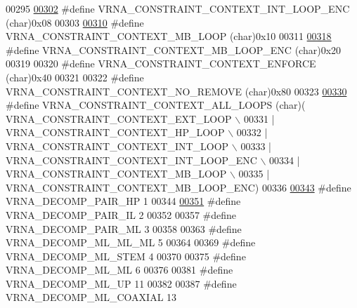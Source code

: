 \begin{DoxyCode}
00295 
\hypertarget{constraints_8h_source_l00302}{}\hyperlink{group__hard__constraints_ga0536288e04ff6332ecdc23ca4705402b}{00302} \textcolor{preprocessor}{#define VRNA\_CONSTRAINT\_CONTEXT\_INT\_LOOP\_ENC  (char)0x08}
00303 
\hypertarget{constraints_8h_source_l00310}{}\hyperlink{group__hard__constraints_ga456ecd2ff00056bb64da8dd4f61bbfc5}{00310} \textcolor{preprocessor}{#define VRNA\_CONSTRAINT\_CONTEXT\_MB\_LOOP       (char)0x10}
00311 
\hypertarget{constraints_8h_source_l00318}{}\hyperlink{group__hard__constraints_ga02a3d703ddbcfce393e4bbfcb9db7077}{00318} \textcolor{preprocessor}{#define VRNA\_CONSTRAINT\_CONTEXT\_MB\_LOOP\_ENC   (char)0x20}
00319 
00320 \textcolor{preprocessor}{#define VRNA\_CONSTRAINT\_CONTEXT\_ENFORCE       (char)0x40}
00321 
00322 \textcolor{preprocessor}{#define VRNA\_CONSTRAINT\_CONTEXT\_NO\_REMOVE     (char)0x80}
00323 
\hypertarget{constraints_8h_source_l00330}{}\hyperlink{group__hard__constraints_ga886d9127c49bb982a4b67cd7581e8a5a}{00330} \textcolor{preprocessor}{#define VRNA\_CONSTRAINT\_CONTEXT\_ALL\_LOOPS     (char)(   VRNA\_CONSTRAINT\_CONTEXT\_EXT\_LOOP \(\backslash\)}
00331 \textcolor{preprocessor}{                                                      | VRNA\_CONSTRAINT\_CONTEXT\_HP\_LOOP \(\backslash\)}
00332 \textcolor{preprocessor}{                                                      | VRNA\_CONSTRAINT\_CONTEXT\_INT\_LOOP \(\backslash\)}
00333 \textcolor{preprocessor}{                                                      | VRNA\_CONSTRAINT\_CONTEXT\_INT\_LOOP\_ENC \(\backslash\)}
00334 \textcolor{preprocessor}{                                                      | VRNA\_CONSTRAINT\_CONTEXT\_MB\_LOOP \(\backslash\)}
00335 \textcolor{preprocessor}{                                                      | VRNA\_CONSTRAINT\_CONTEXT\_MB\_LOOP\_ENC)}
00336 
\hypertarget{constraints_8h_source_l00343}{}\hyperlink{group__generalized__sc_ga8bd41ebc8039378d242e4e8c273716a5}{00343} \textcolor{preprocessor}{#define VRNA\_DECOMP\_PAIR\_HP     1}
00344 
\hypertarget{constraints_8h_source_l00351}{}\hyperlink{group__generalized__sc_gaeab04f34d7730cff2d651d782f95d857}{00351} \textcolor{preprocessor}{#define VRNA\_DECOMP\_PAIR\_IL     2}
00352 
00357 \textcolor{preprocessor}{#define VRNA\_DECOMP\_PAIR\_ML     3}
00358 
00363 \textcolor{preprocessor}{#define VRNA\_DECOMP\_ML\_ML\_ML    5}
00364 
00369 \textcolor{preprocessor}{#define VRNA\_DECOMP\_ML\_STEM     4}
00370 
00375 \textcolor{preprocessor}{#define VRNA\_DECOMP\_ML\_ML       6}
00376 
00381 \textcolor{preprocessor}{#define VRNA\_DECOMP\_ML\_UP       11}
00382 
00387 \textcolor{preprocessor}{#define VRNA\_DECOMP\_ML\_COAXIAL  13}

\end{DoxyCode}
